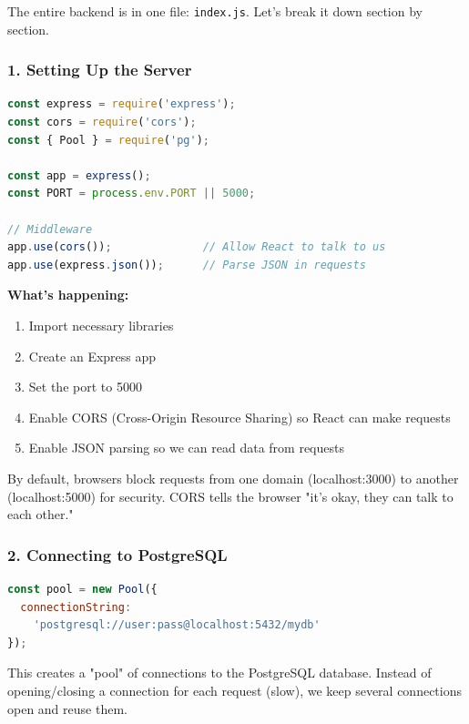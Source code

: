 \documentclass[12pt,a4paper]{article}
\begin{document}
The entire backend is in one file: \texttt{index.js}. Let's break it down section by section.

\subsubsection{1. Setting Up the Server}

\begin{lstlisting}[language=JavaScript, caption=Server Setup]
const express = require('express');
const cors = require('cors');
const { Pool } = require('pg');

const app = express();
const PORT = process.env.PORT || 5000;

// Middleware
app.use(cors());              // Allow React to talk to us
app.use(express.json());      // Parse JSON in requests
\end{lstlisting}

\textbf{What's happening:}
\begin{enumerate}
    \item Import necessary libraries
    \item Create an Express app
    \item Set the port to 5000
    \item Enable CORS (Cross-Origin Resource Sharing) so React can make requests
    \item Enable JSON parsing so we can read data from requests
\end{enumerate}

\begin{tcolorbox}[colback=red!5!white,colframe=red!75!black,title=Why CORS?]
By default, browsers block requests from one domain (localhost:3000) to another (localhost:5000) for security. CORS tells the browser "it's okay, they can talk to each other."
\end{tcolorbox}

\subsubsection{2. Connecting to PostgreSQL}

\begin{lstlisting}[language=JavaScript, caption=Database Connection]
const pool = new Pool({
  connectionString: 
    'postgresql://user:pass@localhost:5432/mydb'
});
\end{lstlisting}

This creates a "pool" of connections to the PostgreSQL database. Instead of opening/closing a connection for each request (slow), we keep several connections open and reuse them.
\end{document}
